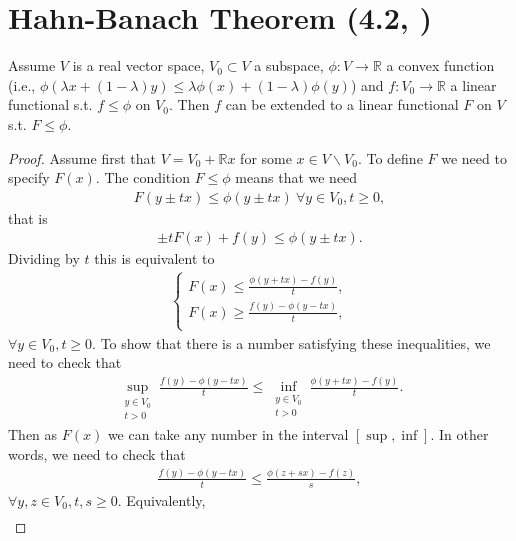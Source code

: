 \section{Hahn-Banach Theorem \tiny{ (4.2, \cite{Gerald_Teschl})}}
\begin{theorem}
    Assume \(V\) is a real vector space, \(V_0\subset V\) a subspace, \(\phi:V\rightarrow\mathbb{R}\) a convex function (i.e., \(\phi(\lambda x + (1-\lambda)y)\leq \lambda\phi(x) + (1 -\lambda)\phi(y)\)) and 
    \(f:V_0\rightarrow\mathbb{R}\) a linear functional s.t. \(f\leq \phi\) on \(V_0\). Then \(f\) can be extended to a linear functional 
    \(F\) on \(V\) s.t. \(F\leq \phi\).
\end{theorem}
\ifdetailed
\begin{proof}
Assume first that \(V = V_0 + \mathbb{R}x\) for some \(x\in V\backslash V_0\). To define \(F\) we need to specify \(F(x)\). The condition \(F\leq \phi\)
means that we need
\begin{align*}
    F(y\pm tx) \leq \phi(y\pm tx) \ \forall y\in V_0, t\geq 0,
\end{align*}
that is 
\begin{align*}
    \pm t F(x) + f(y) \leq \phi(y\pm tx).
\end{align*}
Dividing by \(t\) this is equivalent to 
\begin{align*}
    \begin{cases} 
        F(x) \leq \frac{\phi(y+tx)-f(y)}{t}, \\
        F(x) \geq \frac{f(y)-\phi(y-tx)}{t}, \\
     \end{cases}
\end{align*}
\(\forall y\in V_0, t\geq0\). To show that there is a number satisfying these inequalities, we need to check that
\begin{align*}
    \sup\limits_{\substack{y\in V_0 \\ t>0}} \frac{f(y)-\phi(y-tx)}{t} \leq \inf\limits_{\substack{y\in V_0 \\ t>0}} \frac{\phi(y+tx)-f(y)}{t}.
\end{align*}
Then as \(F(x)\) we can take any number in the interval \([\sup,\inf]\). In other words, we need to check that
\begin{align*}
    \frac{f(y)-\phi(y-tx)}{t} \leq \frac{\phi(z+sx)-f(z)}{s},
\end{align*}
\(\forall y,z\in V_0, t,s\geq0\). Equivalently, 
\begin{align*}

\end{align*}
\end{proof}
